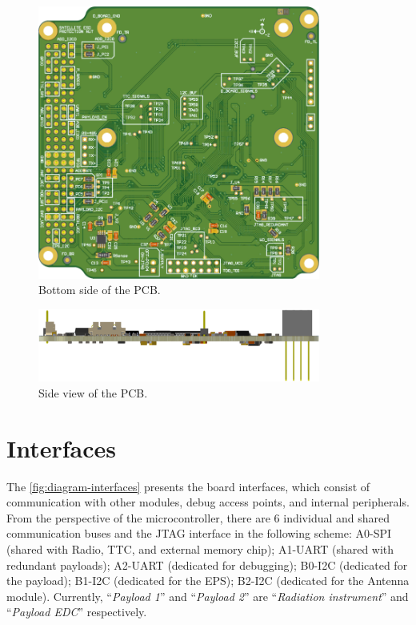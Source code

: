 \begin{figure}[!ht]
    \begin{center}
        \includegraphics[width=93mm]{figures/obdh2-pcb-bottom.png}
        \caption{Bottom side of the PCB.}
        \label{fig:pcb-bottom}
    \end{center}
\end{figure}

\begin{figure}[!ht]
    \begin{center}
        \includegraphics[width=93mm]{figures/obdh2-pcb-side.png}
        \caption{Side view of the PCB.}
        \label{fig:pcb-side}
    \end{center}
\end{figure}


\section{Interfaces}


The \autoref{fig:diagram-interfaces} presents the board interfaces, which consist of communication with other modules, debug access points, and internal peripherals. From the perspective of the microcontroller, there are 6 individual and shared communication buses and the JTAG interface in the following scheme: A0-SPI (shared with Radio, TTC, and external memory chip); A1-UART (shared with redundant payloads); A2-UART (dedicated for debugging); B0-I2C (dedicated for the payload); B1-I2C (dedicated for the EPS); B2-I2C (dedicated for the Antenna module). Currently, ``\textit{Payload 1}'' and ``\textit{Payload 2}'' are ``\textit{Radiation instrument}'' and ``\textit{Payload EDC}'' respectively.

